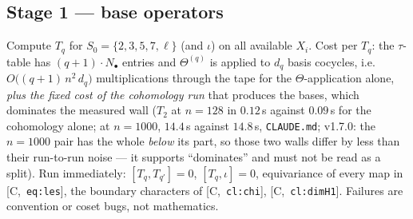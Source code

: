 \documentclass[11pt]{article}
\theoremstyle{remark}
\newcommand{\HA}[1]{[C,~\texttt{#1}]}      %
\begin{document}
\subsection*{Stage 1 --- base operators}
Compute $T_q$ for $S_0=\{2,3,5,7,\ell\}$ (and $\iota$) on all available $X_i$. Cost per
$T_q$: the $\tau$-table has $(q+1)\cdot N_\bullet$ entries and $\Theta^{(q)}$ is applied to $d_q$
basis cocycles, i.e.\ $O\bigl((q+1)\,n^2\,d_q\bigr)$ multiplications through the tape for
the $\Theta$-application alone, \emph{plus the fixed cost of the cohomology run} that produces
the bases, which dominates the measured wall ($T_2$ at $n=128$ in $0.12$\,s against $0.09$\,s
for the cohomology alone; at $n=1000$, $14.4$\,s against $14.8$\,s, \texttt{CLAUDE.md}; v1.7.0:
the $n=1000$ pair has the whole \emph{below} its part, so those two walls differ by less than
their run-to-run noise --- it supports ``dominates'' and must not be read as a split).
Run immediately: $[T_q,T_{q'}]=0$, $[T_q,\iota]=0$, equivariance of every map in \HA{eq:les},
the boundary characters of \HA{cl:chi}, \HA{cl:dimH1}. Failures are convention or
coset bugs, not mathematics.
\end{document}
